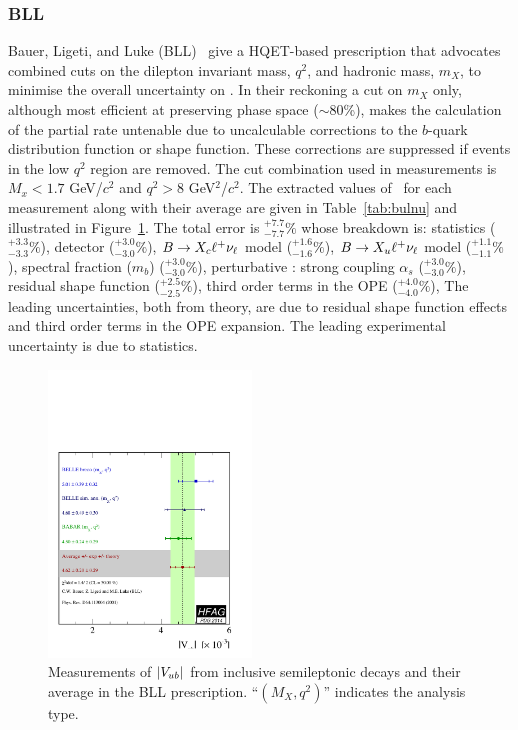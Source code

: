 \subsubsection{BLL}
Bauer, Ligeti, and Luke (BLL)~\cite{ref:BLL} give a
HQET-based prescription that advocates combined cuts on the dilepton invariant mass, $q^2$,
and hadronic mass, $m_X$, to minimise the overall uncertainty on \vub.
In their reckoning a cut on $m_X$ only, although most efficient at
preserving phase space ($\sim$80\%), makes the calculation of the partial
rate untenable due to uncalculable corrections
to the $b$-quark distribution function or shape function. These corrections are
suppressed if events in the low $q^2$ region are removed. The cut combination used
in measurements is $M_x<1.7$ GeV/$c^2$ and $q^2 > 8$ GeV$^2$/$c^2$.  
The extracted values
of \vub\, for each measurement along with their average are given in
Table~\ref{tab:bulnu} and illustrated in Figure~\ref{fig:BLL}.
The total error is $^{+7.7}_{-7.7}\%$ whose breakdown is:
statistics ($^{+3.3}_{-3.3}\%$),
detector ($^{+3.0}_{-3.0}\%$),
$B\to X_c \ell^+ \nu_\ell$ model ($^{+1.6}_{-1.6}\%$),
$B\to X_u \ell^+ \nu_\ell$ model ($^{+1.1}_{-1.1}\%$),
spectral fraction ($m_b$) ($^{+3.0}_{-3.0}\%$),
perturbative : strong coupling $\alpha_s$ ($^{+3.0}_{-3.0}\%$),
residual shape function ($^{+2.5}_{-2.5}\%$),
third order terms in the OPE ($^{+4.0}_{-4.0}\%$),
The leading
uncertainties, both from theory, are due to residual shape function
effects and third order terms in the OPE expansion. The leading
experimental uncertainty is due to statistics. 

\begin{figure}
\begin{center}
\includegraphics[width=0.48\textwidth]{figures/slb/vub_mxq2_allMoments.pdf}
\end{center}
\caption{Measurements of $|V_{ub}|$ from inclusive semileptonic decays 
and their average in the BLL prescription.
``$(M_X, q^2)$'' indicates the analysis type.}
\label{fig:BLL}
\end{figure}



